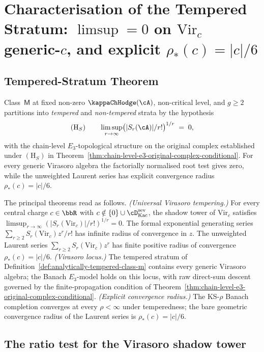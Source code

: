 \chapter{Characterisation of the Tempered Stratum: $\limsup = 0$
on $\mathrm{Vir}_c$ generic-$c$, and explicit $\rho_*(c) = |c|/6$}
\label{ch:tempered-stratum-characterization}

\section*{Tempered-Stratum Theorem}

Class~$\mathsf{M}$ at fixed non-zero $\kappaChHodge(\cA)$, non-critical
level, and $g \ge 2$ partitions into \emph{tempered} and
\emph{non-tempered} strata by the hypothesis
\[
 (\mathrm{H}_S) \qquad
 \limsup_{r \to \infty}
 \bigl( \lvert S_r(\cA) \rvert / r! \bigr)^{1/r}
 \;=\;
 0,
\]
with the chain-level $E_3$-topological structure on the original
complex established under $(\mathrm{H}_S)$ in
Theorem~\ref{thm:chain-level-e3-original-complex-conditional}. For
every generic Virasoro algebra the factorially normalised root test
gives zero, while the unweighted Laurent series has explicit
convergence radius $\rho_*(c)=|c|/6$.

The principal theorems read as follows.
\emph{(Universal Virasoro tempering.)} For every central charge
$c \in \bbR$ with $c \notin \{0\} \cup \cD^{\mathrm{sev}}_{\mathrm{Kac}}$,
the shadow tower of $\mathrm{Vir}_c$ satisfies
$\limsup_{r \to \infty} (\lvert S_r(\mathrm{Vir}_c) \rvert / r!)^{1/r}
= 0$. The formal exponential generating series
$\sum_{r \ge 2} S_r(\mathrm{Vir}_c) z^r / r!$ has infinite radius of
convergence in $z$. The unweighted Laurent series
$\sum_{r \ge 2} S_r(\mathrm{Vir}_c) z^r$ has finite positive radius
of convergence $\rho_*(c) = |c|/6$.
\emph{(Virasoro locus.)} The tempered stratum of
Definition~\ref{def:analytically-tempered-class-m} contains every
generic Virasoro algebra; the Banach $E_3$-model holds on this
locus, with raw direct-sum descent governed by the
finite-propagation condition of
Theorem~\ref{thm:chain-level-e3-original-complex-conditional}.
\emph{(Explicit convergence radius.)} The KS-$\rho$ Banach completion
converges at every $\rho < \infty$ under temperedness; the bare
geometric convergence radius of the Laurent series is
$\rho_*(c) = |c|/6$.

\section{The ratio test for the Virasoro shadow tower}
\label{sec:ratio-test}

